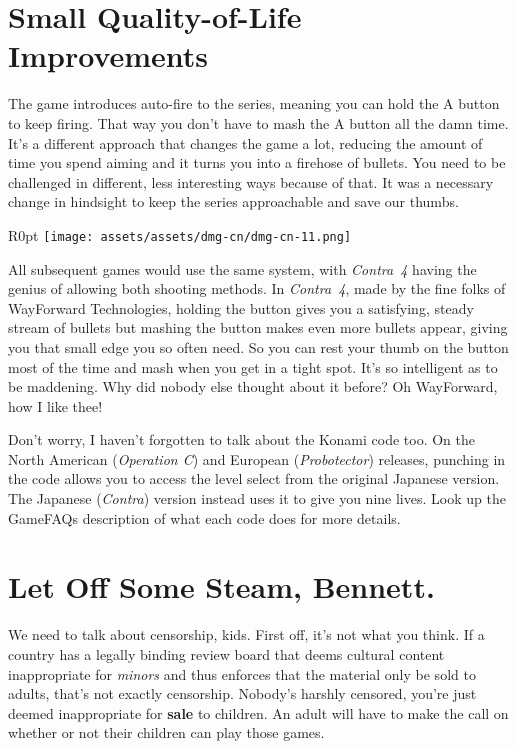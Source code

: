 \documentclass{book}
\begin{document}
\FloatBarrier\needspace{5pt}\section*{Small Quality-of-Life Improvements}\nopagebreak[4]

The game introduces auto-fire to the series, meaning you can hold the A button to keep firing. That way you don’t have to mash the A button all the damn time. It’s a different approach that changes the game a lot, reducing the amount of time you spend aiming and it turns you into a firehose of bullets. You need to be challenged in different, less interesting ways because of that. It was a necessary change in hindsight to keep the series approachable and save our thumbs.

\begin{wrapfigure}{R}{0pt} \texttt{[image: assets/assets/dmg-cn/dmg-cn-11.png]}\end{wrapfigure}
All subsequent games would use the same system, with \emph{Contra 4} having the genius of allowing both shooting methods. In \emph{Contra 4}, made by the fine folks of WayForward Technologies, holding the button gives you a satisfying, steady stream of bullets but mashing the button makes even more bullets appear, giving you that small edge you so often need. So you can rest your thumb on the button most of the time and mash when you get in a tight spot. It’s so intelligent as to be maddening. Why did nobody else thought about it before? Oh WayForward, how I like thee!

Don’t worry, I haven’t forgotten to talk about the Konami code too. On the North American (\emph{Operation C}) and European (\emph{Probotector}) releases, punching in the code allows you to access the level select from the original Japanese version. The Japanese (\emph{Contra}) version instead uses it to give you nine lives. Look up the GameFAQs description of what each code does for more details.

\FloatBarrier\needspace{5pt}\section*{Let Off Some Steam, Bennett.}\nopagebreak[4]

We need to talk about censorship, kids. First off, it’s not what you think. If a country has a legally binding review board that deems cultural content inappropriate for \emph{minors} and thus enforces that the material only be sold to adults, that’s not exactly censorship. Nobody’s harshly censored, you’re just deemed inappropriate for \textbf{sale} to children. An adult will have to make the call on whether or not their children can play those games.
\end{document}
